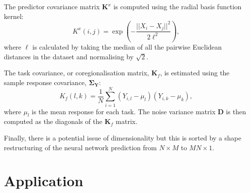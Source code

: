 The predictor covariance matrix \(\mathbf{K}^x\) is computed using the radial basis function kernel:
\[
K^x(i,j) = \exp \left( -\frac{||X_i - X_j||^2}{2 \ell^2} \right),
\]
\noindent where $\ell$ is calculated by taking the median of all the pairwise Euclidean distances in the dataset and normalising by $\sqrt{2}$.\cite{bonilla2007multi}

The task covariance, or coregionalisation matrix, \(\mathbf{K}_f\), is estimated using the sample response covariance, $\mathbf{\Sigma_Y}$:
\vspace{-0.2cm}
\[
K_f(l, k) = \frac{1}{N} \sum_{i=1}^{N} (Y_{i,l} - \mu_l)(Y_{i,k} - \mu_k),
\]
\noindent where \(\mu_l\) is the mean response for each task. The noise variance matrix \(\mathbf{D}\) is then computed as the diagonals of the $\mathbf{K}_f$ matrix.\cite{bonilla2007multi} 

Finally, there is a potential issue of dimensionality but this is sorted by a shape restructuring of the neural network prediction from $N\times M$ to $MN\times1$.


\section{Application}


